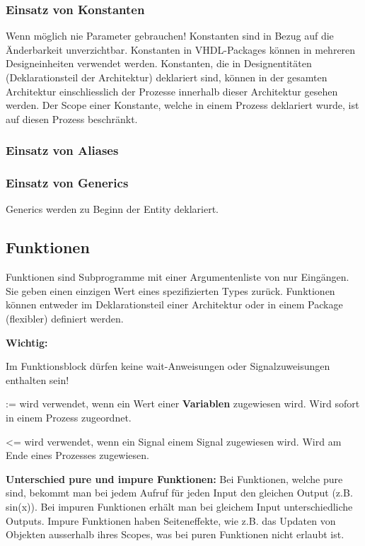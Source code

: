 \subsubsection{Einsatz von Konstanten}
Wenn möglich nie Parameter gebrauchen! Konstanten sind in Bezug auf die Änderbarkeit unverzichtbar. Konstanten in VHDL-Packages können in mehreren Designeinheiten verwendet werden. Konstanten, die in Designentitäten (Deklarationsteil der Architektur) deklariert sind, können in der gesamten Architektur einschliesslich der Prozesse innerhalb dieser Architektur gesehen werden. Der Scope einer Konstante, welche in einem Prozess deklariert wurde, ist auf diesen Prozess beschränkt.

\subsubsection{Einsatz von Aliases}

\subsubsection{Einsatz von Generics}
Generics werden zu Beginn der Entity deklariert.


\subsection{Funktionen}$~$ \\
Funktionen sind Subprogramme mit einer Argumentenliste von nur Eingängen. Sie geben einen einzigen Wert eines spezifizierten Types zurück. Funktionen können entweder im Deklarationsteil einer Architektur oder in einem Package (flexibler) definiert werden.

\textbf{Wichtig:}
\begin{compactitem}
    \item Im Funktionsblock dürfen keine wait-Anweisungen oder Signalzuweisungen enthalten sein!
    \item := wird verwendet, wenn ein Wert einer \textbf{Variablen} zugewiesen wird. Wird sofort in einem Prozess zugeordnet.
    \item \textless= wird verwendet, wenn ein Signal einem Signal zugewiesen wird. Wird am Ende eines Prozesses zugewiesen.
\end{compactitem}
\textbf{Unterschied pure und impure Funktionen:} Bei Funktionen, welche pure sind, bekommt man bei jedem Aufruf für jeden Input den gleichen Output (z.B. sin(x)). Bei impuren Funktionen erhält man bei gleichem Input unterschiedliche Outputs. Impure Funktionen haben Seiteneffekte, wie z.B. das Updaten von Objekten ausserhalb ihres Scopes, was bei puren Funktionen nicht erlaubt ist.


